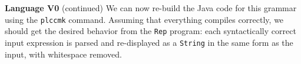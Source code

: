 \begin{minipage}[t]{\sw}
\slidenumber
\LARGE
{\bf Language V0} (continued)\exx
We can now re-build the Java code for this grammar
using the \verb'plccmk' command.
Assuming that everything compiles correctly,
we should get the desired behavior from the \verb'Rep' program:
each syntactically correct input expression
is parsed and re-displayed as a \verb'String'
in the same form as the input,
with whitespace removed.
\end{minipage}
